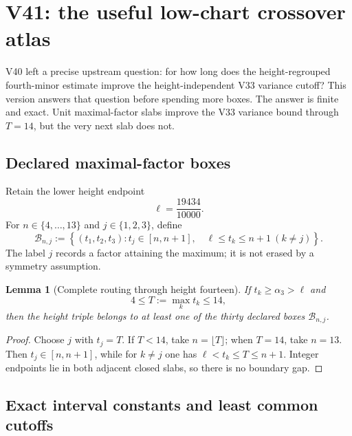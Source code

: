 \documentclass[11pt]{article}
\newtheorem{lemma}[theorem]{Lemma}
\theoremstyle{definition}
\theoremstyle{remark}
\begin{document}



\section{V41: the useful low-chart crossover atlas}
\label{sec:f2v41-crossover}

V40 left a precise upstream question: for how long does the
height-regrouped fourth-minor estimate improve the height-independent V33
variance cutoff?  This version answers that question before spending more
boxes.  The answer is finite and exact.  Unit maximal-factor slabs improve
the V33 variance bound through \(T=14\), but the very next slab does not.

\subsection{Declared maximal-factor boxes}

Retain the lower height endpoint
\[
 \ell=\frac{19434}{10000}.
\tag{N41.1}
\]
For \(n\in\{4,\ldots,13\}\) and \(j\in\{1,2,3\}\), define
\[
 \mathcal B_{n,j}:=
 \left\{(t_1,t_2,t_3):
 t_j\in[n,n+1],\quad
 \ell\leq t_k\leq n+1\ (k\neq j)\right\}.
\tag{N41.2}
\]
The label \(j\) records a factor attaining the maximum; it is not erased
by a symmetry assumption.

\begin{lemma}[Complete routing through height fourteen]
\label{lem:f2v41-routing}
If \(t_k\geq\alpha_3>\ell\) and
\[
 4\leq T:=\max_kt_k\leq14,
\tag{N41.3}
\]
then the height triple belongs to at least one of the thirty declared
boxes \(\mathcal B_{n,j}\).
\end{lemma}

\begin{proof}
Choose \(j\) with \(t_j=T\).  If \(T<14\), take
\(n=\lfloor T\rfloor\); when \(T=14\), take \(n=13\).  Then
\(t_j\in[n,n+1]\), while for \(k\neq j\) one has
\(\ell<t_k\leq T\leq n+1\).  Integer endpoints lie in both adjacent
closed slabs, so there is no boundary gap.
\end{proof}

\subsection{Exact interval constants and least common cutoffs}
\end{document}
